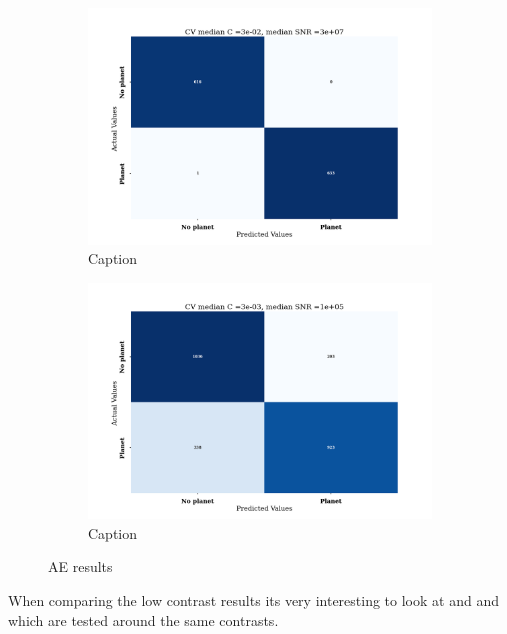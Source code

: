 \begin{figure}[!hb]
\begin{subfigure}{0.4\textwidth}
    \centering
    \includegraphics[scale=0.25]{images/Chapter3/confusion_transfer_sdae_CV_cmin_1e-02_cmax_1e-01_dsnrmin_1e+07_dsnrmax_1e+08.png}
    \caption{Caption}
    \label{fig:ae1e-2_1e-1}
\end{subfigure}
\hfill
\begin{subfigure}{0.4\textwidth}
    \centering
    \includegraphics[scale=0.3]{images/Chapter3/confusion_RF_CV_1e-03_cmax_1e-02_dsnrmin_1e+04_dsnrmax_1e+06.png}
    \caption{Caption}
    \label{fig:ae1e-3_1e-2}
\end{subfigure}
\caption{AE results}
\end{figure}
When comparing the low contrast results its very interesting to look at  and  and  which are tested around the same contrasts.
